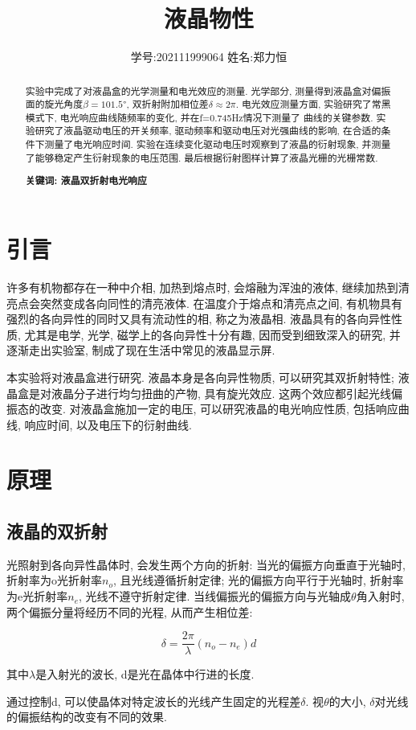 \documentclass[12pt,a4paper]{article}
\title{\vspace{-4cm}\Large 液晶物性}  %
\author{\kaishu 学号:202111999064 \hspace{2cm} 姓名:郑力恒}   %
\date{}
\newcommand{\be}[1]{
    \begin{equation}
        #1
    \end{equation}
}
\begin{document}
\maketitle

\begin{abstract}
    实验中完成了对液晶盒的光学测量和电光效应的测量. 光学部分, 测量得到液晶盒对偏振面的旋光角度$\beta=101.5°$, 双折射附加相位差$\delta \approx 2\pi$. 电光效应测量方面, 实验研究了常黑模式下, 电光响应曲线随频率的变化, 并在f=0.745Hz情况下测量了
曲线的关键参数. 实验研究了液晶驱动电压的开关频率, 驱动频率和驱动电压对光强曲线的影响, 在合适的条件下测量了电光响应时间. 实验在连续变化驱动电压时观察到了液晶的衍射现象, 并测量了能够稳定产生衍射现象的电压范围. 最后根据衍射图样计算了液晶光栅的光栅常数. 

\textbf{关键词: 液晶\quad 双折射\quad 电光响应}
\end{abstract}

\section{引言}
许多有机物都存在一种中介相, 加热到熔点时, 会熔融为浑浊的液体, 继续加热到清亮点会突然变成各向同性的清亮液体. 
在温度介于熔点和清亮点之间, 有机物具有强烈的各向异性的同时又具有流动性的相, 称之为液晶相. 液晶具有的各向异性性质, 尤其是电学, 光学, 磁学上的各向异性十分有趣, 因而受到细致深入的研究, 并逐渐走出实验室, 制成了现在生活中常见的液晶显示屏. 

本实验将对液晶盒进行研究. 液晶本身是各向异性物质, 可以研究其双折射特性; 液晶盒是对液晶分子进行均匀扭曲的产物, 具有旋光效应. 这两个效应都引起光线偏振态的改变. 
对液晶盒施加一定的电压, 可以研究液晶的电光响应性质, 包括响应曲线, 响应时间, 以及电压下的衍射曲线.
\section{原理}
\subsection{液晶的双折射}
光照射到各向异性晶体时, 会发生两个方向的折射: 当光的偏振方向垂直于光轴时, 折射率为o光折射率$n_{o}$, 且光线遵循折射定律; 光的偏振方向平行于光轴时, 折射率为e光折射率$n_{e}$, 光线不遵守折射定律. 当线偏振光的偏振方向与光轴成$\theta$角入射时, 两个偏振分量将经历不同的光程, 从而产生相位差: 
\be{\delta=\frac{2\pi}{\lambda}(n_{o}-n_{e})d}
其中$\lambda$是入射光的波长, d是光在晶体中行进的长度. 

通过控制d, 可以使晶体对特定波长的光线产生固定的光程差$\delta$. 视$\theta$的大小, $\delta$对光线的偏振结构的改变有不同的效果. 
\end{document}
